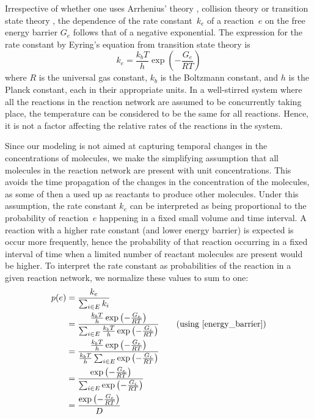 Irrespective of whether one uses Arrhenius' theory \cite{arrhenius1,arrhenius2}, collision theory or transition state theory \cite{eyring_equation}, the dependence of the rate constant~$k_e$ of a reaction~$e$ on the free energy barrier $G_e$ follows that of a negative exponential. The expression for the rate constant by Eyring's equation from transition state theory is
\begin{equation}
    k_e = \frac{k_b T}{h} \exp\left(-\frac{G_e}{RT}\right) \label{energy_barrier}
\end{equation}
where $R$ is the universal gas constant, $k_b$ is the Boltzmann constant, and $h$ is the Planck constant, each in their appropriate units.
In a well-stirred system where all the reactions in the reaction network are assumed to be concurrently taking place, the temperature can be considered to be the same for all reactions. Hence, it is not a factor affecting the relative rates of the reactions in the system.

Since our modeling is not aimed at capturing temporal changes in the concentrations of molecules, we make the simplifying assumption that all molecules in the reaction network are present with unit concentrations. 
This avoids the time propagation of the changes in the concentration of the molecules, as some of then a used up as reactants to produce other molecules.  
Under this assumption, the rate constant $k_e$ can be interpreted as being proportional to the probability of reaction~$e$ happening in a fixed small volume and time interval. 
A reaction with a higher rate constant (and lower energy barrier) is expected is occur more frequently, hence the probability of that reaction occurring in a fixed interval of time when a limited number of reactant molecules are present would be higher.
To interpret the rate constant as probabilities of the reaction in a given reaction network, we normalize these values to sum to one:
\begin{align}
    p(e) &= \frac{k_e}{\sum_{i\in E} k_i} \nonumber \\ 
    &= \frac{\frac{k_b T}{h} \exp\left(-\frac{G_e}{RT}\right)}{\sum_{i\in E} \frac{k_b T}{h} \exp\left(-\frac{G_i}{RT}\right)}\tag{\text{using }\ref{energy_barrier}} \\
    &= \frac{\frac{k_b T}{h} \exp\left(-\frac{G_e}{RT}\right)}{\frac{k_b T}{h} \sum_{i\in E} \exp\left(-\frac{G_i}{RT}\right)} \nonumber \\
    &= \frac{\exp\left(-\frac{G_e}{RT}\right)}{\sum_{i\in E} \exp\left(-\frac{G_i}{RT}\right)} \nonumber \\
    &= \frac{\exp\left(-\frac{G_e}{RT}\right)}{D} \label{prob_reaction}
\end{align}

